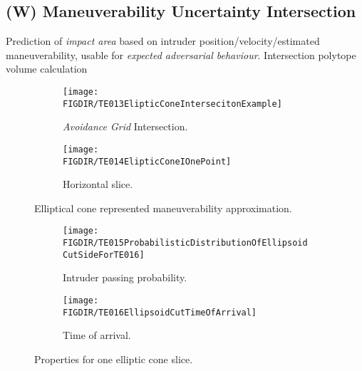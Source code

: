 \subsection{(W) Maneuverability Uncertainty Intersection}\label{s:uncertaintyIntersection}
    \noindent Prediction of \emph{impact area} based on intruder position/velocity/estimated maneuverability, usable for \emph{expected adversarial behaviour}. Intersection polytope volume calculation \cite{lawrence1991polytope}
    
    \begin{figure}[H]
    	\centering
        \begin{subfigure}{0.48\textwidth}
            \texttt{[image: \\FIGDIR/TE013ElipticConeIntersecitonExample]}
            \caption{\emph{Avoidance Grid} Intersection.}
            \label{fig:ellipticConeIntersectionExample}
        \end{subfigure}
        \begin{subfigure}{0.48\textwidth}
            \texttt{[image: \\FIGDIR/TE014ElipticConeIOnePoint]} 
            \caption{Horizontal slice.}
            \label{fig:ellipticalConeHorizontalSlice}
        \end{subfigure}
        \caption{Elliptical cone represented maneuverability approximation. }
        \label{fig:ellipticalConeRepresentedManuevurabilityApproximation}
    \end{figure}
    
    \begin{figure}[H]
    	\centering
        \begin{subfigure}{0.48\textwidth}
            \texttt{[image: \\FIGDIR/TE015ProbabilisticDistributionOfEllipsoidCutSideForTE016]}
            \caption{Intruder passing probability.}
            \label{fig:intruderPassingProbability}
        \end{subfigure}
        \begin{subfigure}{0.48\textwidth}
            \texttt{[image: \\FIGDIR/TE016EllipsoidCutTimeOfArrival]} 
            \caption{Time of arrival.}
            \label{fig:intruderTimeOfArrival}
        \end{subfigure}
        \caption{Properties for one elliptic cone slice. }
        \label{fig:propertiesEllipticConeSlice}
    \end{figure}

